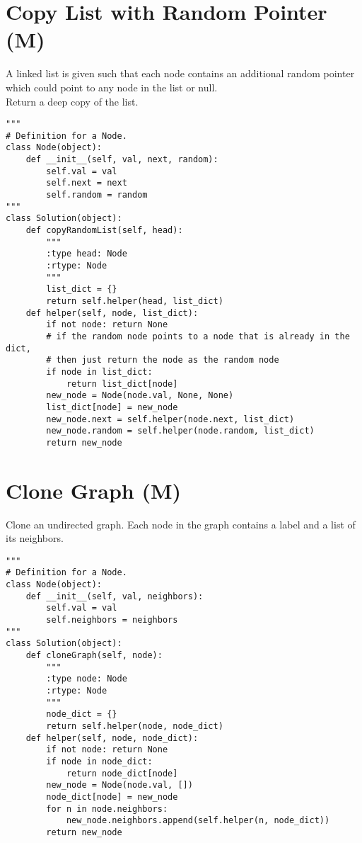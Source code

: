 \section{Copy List with Random Pointer (M)}
A linked list is given such that each node contains an additional random pointer which could point to any node in the list or null.\\

Return a deep copy of the list.\\

\begin{lstlisting}
"""
# Definition for a Node.
class Node(object):
    def __init__(self, val, next, random):
        self.val = val
        self.next = next
        self.random = random
"""
class Solution(object):
    def copyRandomList(self, head):
        """
        :type head: Node
        :rtype: Node
        """
        list_dict = {}
        return self.helper(head, list_dict)
    def helper(self, node, list_dict):
        if not node: return None
        # if the random node points to a node that is already in the dict,
        # then just return the node as the random node
        if node in list_dict: 
            return list_dict[node]
        new_node = Node(node.val, None, None)
        list_dict[node] = new_node
        new_node.next = self.helper(node.next, list_dict)
        new_node.random = self.helper(node.random, list_dict)
        return new_node
\end{lstlisting}


\section{Clone Graph (M)}
Clone an undirected graph. Each node in the graph contains a label and a list of its neighbors. \\

\begin{lstlisting}
"""
# Definition for a Node.
class Node(object):
    def __init__(self, val, neighbors):
        self.val = val
        self.neighbors = neighbors
"""
class Solution(object):
    def cloneGraph(self, node):
        """
        :type node: Node
        :rtype: Node
        """
        node_dict = {}
        return self.helper(node, node_dict)
    def helper(self, node, node_dict):
        if not node: return None
        if node in node_dict:
            return node_dict[node]
        new_node = Node(node.val, [])
        node_dict[node] = new_node
        for n in node.neighbors:
            new_node.neighbors.append(self.helper(n, node_dict))
        return new_node
\end{lstlisting}

